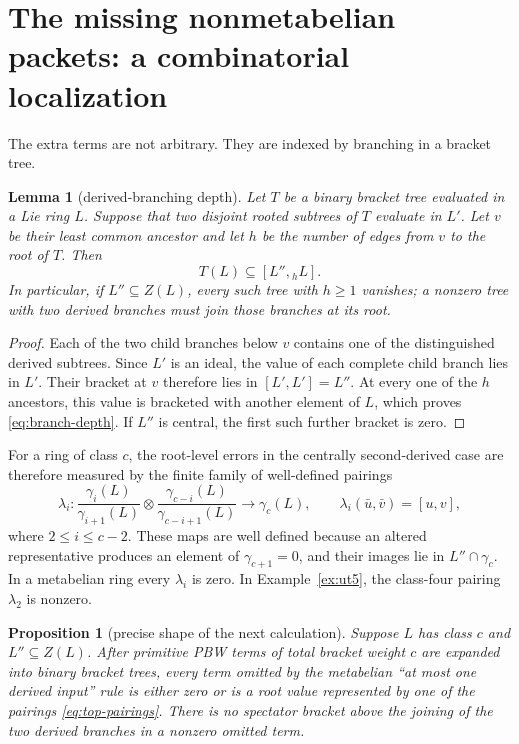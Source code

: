 \documentclass[a4paper,11pt,reqno]{amsart}
\newtheorem{proposition}[theorem]{Proposition}
\newtheorem{lemma}[theorem]{Lemma}
\theoremstyle{definition}
\theoremstyle{remark}
\newcommand{\gm}{\gamma}
\begin{document}
\section{The missing nonmetabelian packets: a combinatorial localization}

The extra terms are not arbitrary.  They are indexed by branching in a
bracket tree.

\begin{lemma}[derived-branching depth]\label{lem:branching}
Let $T$ be a binary bracket tree evaluated in a Lie ring $L$.  Suppose that
two disjoint rooted subtrees of $T$ evaluate in $L'$.  Let $v$ be their least
common ancestor and let $h$ be the number of edges from $v$ to the root of
$T$.  Then
\begin{equation}\label{eq:branch-depth}
                 T(L)\subseteq[L'',{}_hL].
\end{equation}
In particular, if $L''\subseteq Z(L)$, every such tree with $h\geq1$
vanishes; a nonzero tree with two derived branches must join those branches
at its root.
\end{lemma}

\begin{proof}
Each of the two child branches below $v$ contains one of the distinguished
derived subtrees.  Since $L'$ is an ideal, the value of each complete child
branch lies in $L'$.  Their bracket at $v$ therefore lies in
$[L',L']=L''$.  At every one of the $h$ ancestors, this value is bracketed
with another element of $L$, which proves \eqref{eq:branch-depth}.  If $L''$
is central, the first such further bracket is zero.
\end{proof}

For a ring of class $c$, the root-level errors in the centrally
second-derived case are therefore measured by the finite family of
well-defined pairings
\begin{equation}\label{eq:top-pairings}
 \lambda_i:
 \frac{\gm_i(L)}{\gm_{i+1}(L)}\otimes
 \frac{\gm_{c-i}(L)}{\gm_{c-i+1}(L)}
 \longrightarrow \gm_c(L),
 \qquad \lambda_i(\bar u,\bar v)=[u,v],
\end{equation}
where $2\leq i\leq c-2$.  These maps are well defined because an altered
representative produces an element of $\gm_{c+1}=0$, and their images lie in
$L''\cap\gm_c$.  In a metabelian ring every $\lambda_i$ is zero.  In
Example~\ref{ex:ut5}, the class-four pairing $\lambda_2$ is nonzero.

\begin{proposition}[precise shape of the next calculation]
\label{prop:next-calculation}
Suppose $L$ has class $c$ and $L''\subseteq Z(L)$.  After primitive PBW
terms of total bracket weight $c$ are expanded into binary bracket trees,
every term omitted by the metabelian ``at most one derived input'' rule is
either zero or is a root value represented by one of the pairings
\eqref{eq:top-pairings}.  There is no spectator bracket \emph{above} the
joining of the two derived branches in a nonzero omitted term.
\end{proposition}
\end{document}
